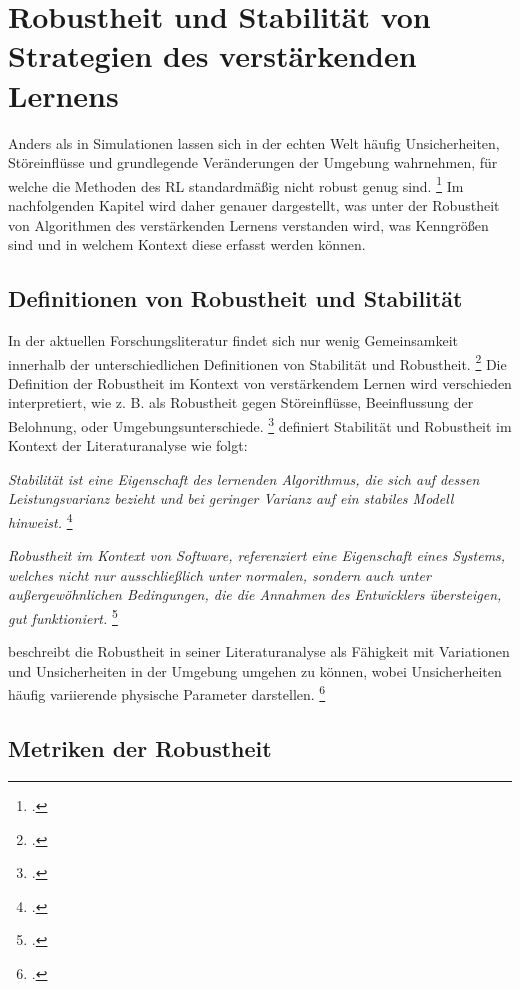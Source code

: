 \section{Robustheit und Stabilität von Strategien des verstärkenden Lernens}

Anders als in Simulationen lassen sich in der echten Welt häufig Unsicherheiten, Störeinflüsse und grundlegende Veränderungen der Umgebung wahrnehmen, für welche die Methoden des RL standardmäßig nicht robust genug sind. \footcite[Vgl.][S. 1]{Moos.2022}
Im nachfolgenden Kapitel wird daher genauer dargestellt, was unter der Robustheit von Algorithmen des verstärkenden Lernens verstanden wird, was Kenngrößen sind und in welchem Kontext diese erfasst werden können.

\subsection{Definitionen von Robustheit und Stabilität}

In der aktuellen Forschungsliteratur findet sich nur wenig Gemeinsamkeit innerhalb der unterschiedlichen Definitionen von Stabilität und Robustheit. \footcite[Vgl.][S. 5]{Pullum.2022}
Die Definition der Robustheit im Kontext von verstärkendem Lernen wird verschieden interpretiert, wie z. B. als Robustheit gegen Störeinflüsse, Beeinflussung der Belohnung, oder Umgebungsunterschiede. \footcite[Vgl.][S. 2]{Liu.2023}
\cite[]{Pullum.2022} definiert Stabilität und Robustheit im Kontext der Literaturanalyse wie folgt:

\textit{Stabilität ist eine Eigenschaft des lernenden Algorithmus, die sich auf dessen Leistungsvarianz bezieht und bei geringer Varianz auf ein stabiles Modell hinweist.} \footcite[Vgl.][S. 5]{Pullum.2022}

\textit{Robustheit im Kontext von Software, referenziert eine Eigenschaft eines Systems, welches nicht nur ausschließlich unter normalen, sondern auch unter außergewöhnlichen Bedingungen, die die Annahmen des Entwicklers übersteigen, gut funktioniert.} \footcite[Vgl.][S. 5]{Pullum.2022}

\cite[]{Moos.2022} beschreibt die Robustheit in seiner Literaturanalyse als Fähigkeit mit Variationen und Unsicherheiten in der Umgebung umgehen zu können, wobei Unsicherheiten häufig variierende physische Parameter darstellen. \footcite[Vgl.][S. 1]{Moos.2022}

\subsection{Metriken der Robustheit}

